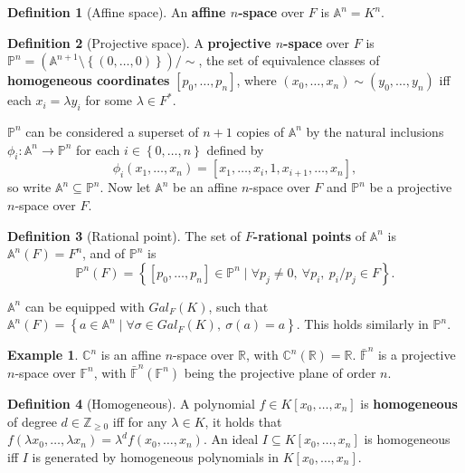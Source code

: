 \documentclass{article}
\newcommand{\F}{\mathbb{F}}
\newcommand{\Z}{\mathbb{Z}}
\newcommand{\R}{\mathbb{R}}
\newcommand{\C}{\mathbb{C}}
\newcommand{\A}{\mathbb{A}}
\renewcommand{\P}{\mathbb{P}}
\newcommand{\rb}[1]{\left( #1 \right)}
\renewcommand{\sb}[1]{\left[ #1 \right]}
\newcommand{\cb}[1]{\left\{ #1 \right\}}
\theoremstyle{definition}\newtheorem*{definition}{Definition}
\theoremstyle{definition}\newtheorem*{example}{Example}
\theoremstyle{definition}\newtheorem*{remark}{Remark}
\begin{document}
\begin{definition}[Affine space]
An \textbf{affine $ n $-space} over $ F $ is $ \A^n = K^n $.
\end{definition}

\begin{definition}[Projective space]
A \textbf{projective $ n $-space} over $ F $ is $ \P^n = \rb{\A^{n + 1} \setminus \cb{\rb{0, \dots, 0}}} / \sim $, the set of equivalence classes of \textbf{homogeneous coordinates} $ \sb{p_0, \dots, p_n} $, where $ \rb{x_0, \dots, x_n} \sim \rb{y_0, \dots, y_n} $ iff each $ x_i = \lambda y_i $ for some $ \lambda \in F^* $.
\end{definition}

$ \P^n $ can be considered a superset of $ n + 1 $ copies of $ \A^n $ by the natural inclusions $ \phi_i : \A^n \to \P^n $ for each $ i \in \cb{0, \dots, n} $ defined by
$$ \phi_i\rb{x_1, \dots, x_n} = \sb{x_1, \dots, x_i, 1, x_{i + 1}, \dots, x_n}, $$
so write $ \A^n \subseteq \P^n $. Now let $ \A^n $ be an affine $ n $-space over $ F $ and $ \P^n $ be a projective $ n $-space over $ F $.

\begin{definition}[Rational point]
The set of \textbf{$ F $-rational points} of $ \A^n $ is $ \A^n\rb{F} = F^n $, and of $ \P^n $ is
$$ \P^n\rb{F} = \cb{\sb{p_0, \dots, p_n} \in \P^n \mid \forall p_j \ne 0, \ \forall p_i, \ p_i / p_j \in F}. $$
\end{definition}

$ \A^n $ can be equipped with $ Gal_F\rb{K} $, such that $ \A^n\rb{F} = \cb{a \in \A^n \mid \forall \sigma \in Gal_F\rb{K}, \ \sigma\rb{a} = a} $. This holds similarly in $ \P^n $.

\begin{example}
$ \C^n $ is an affine $ n $-space over $ \R $, with $ \C^n\rb{\R} = \R $. $ \bar{\F}^n $ is a projective $ n $-space over $ \F^n $, with $ \bar{\F}^n\rb{\F^n} $ being the projective plane of order $ n $.
\end{example}

\begin{definition}[Homogeneous]
A polynomial $ f \in K\sb{x_0, \dots, x_n} $ is \textbf{homogeneous} of degree $ d \in \Z_{\ge 0} $ iff for any $ \lambda \in K $, it holds that $ f\rb{\lambda x_0, \dots, \lambda x_n} = \lambda^d f\rb{x_0, \dots, x_n} $. An ideal $ I \subseteq K\sb{x_0, \dots, x_n} $ is homogeneous iff $ I $ is generated by homogeneous polynomials in $ K\sb{x_0, \dots, x_n} $.
\end{definition}
\end{document}

